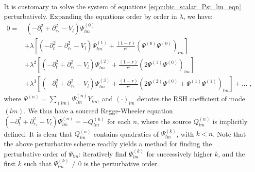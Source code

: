 It is customary to solve the system of equations \eqref{eq:cubic_scalar_Psi_lm_eqn} perturbatively.
Expanding the equations order by order in $\lambda$, we have:
\begin{align}
  0 =& \  (-\partial_t^2 +  \partial_{r_*}^2 - V_l) \Psi_{lm}^{(0)} \nonumber \\
        & +  \lambda \left[(-\partial_t^2 +  \partial_{r_*}^2 - V_l) \Psi_{lm}^{(1)} + \frac{(1-r)}{r^2} \left(\Psi^{(0)} \Psi^{(0)}\right)_{lm} \right] \nonumber \\
        & +  \lambda^2 \left[(-\partial_t^2 +  \partial_{r_*}^2 - V_l) \Psi_{lm}^{(2)} + \frac{(1-r)}{r^2} \left(2 \Psi^{(1)} \Psi^{(0)}\right)_{lm} \right] \nonumber \\
        & +  \lambda^3 \left[(-\partial_t^2 +  \partial_{r_*}^2 - V_l) \Psi_{lm}^{(3)} + \frac{(1-r)}{r^2} \left(2 \Psi^{(2)} \Psi^{(0)} + \Psi^{(1)} \Psi^{(1)}\right)_{lm} \right]
          + \hdots \;,
\end{align}
where $\Psi^{(n)} = \sum_{(lm)} \Psi_{lm}^{(n)} Y_{lm}$, and $(\cdot)_{lm}$ denotes the RSH coefficient of mode $(lm)$.
We thus have a sourced Regge-Wheeler equation $(-\partial_t^2 +  \partial_{r_*}^2 - V_l) \Psi_{lm}^{(n)}  = -Q_{lm}^{(n)}$ for each $n$, where the source $Q_{lm}^{(n)}$ is implicitly defined.
It is clear that $Q_{lm}^{(n)}$ contains quadratics of $\Psi_{lm}^{(k)}$, with $k < n$.
Note that the above perturbative scheme readily yields a method for finding the perturbative order of $\Psi_{lm}$: iteratively find $\Psi_{lm}^{(k)}$ for successively higher $k$, and the first $k$ such that $\Psi_{lm}^{(k)} \neq 0$ is the perturbative order.




